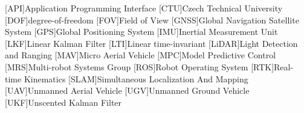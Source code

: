 \begin{acronym}
  [API]{Application Programming Interface}
  [CTU]{Czech Technical University}
  [DOF]{degree-of-freedom}
  [FOV]{Field of View}
  [GNSS]{Global Navigation Satellite System}
  [GPS]{Global Positioning System}
  [IMU]{Inertial Measurement Unit}
  [LKF]{Linear Kalman Filter}
  [LTI]{Linear time-invariant}
  [LiDAR]{Light Detection and Ranging}
  [MAV]{Micro Aerial Vehicle}
  [MPC]{Model Predictive Control}
  [MRS]{Multi-robot Systems Group}
  [ROS]{Robot Operating System}
  [RTK]{Real-time Kinematics}
  [SLAM]{Simultaneous Localization And Mapping}
  [UAV]{Unmanned Aerial Vehicle}
  [UGV]{Unmanned Ground Vehicle}
  [UKF]{Unscented Kalman Filter}
\end{acronym}
